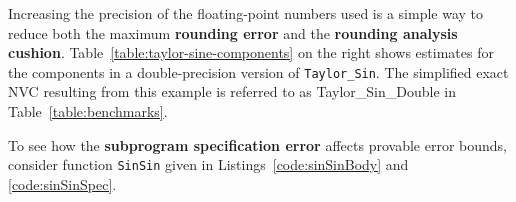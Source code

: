 \documentclass[runningheads]{llncs}
\begin{document}
Increasing the precision of the floating-point numbers used is a simple way to reduce both the maximum \textbf{rounding error} and the \textbf{rounding analysis cushion}.
Table~\ref{table:taylor-sine-components} on the right shows estimates for the components in a double-precision version of \lstinline{Taylor_Sin}.
The simplified exact NVC resulting from this example is referred to as Taylor\_Sin\_Double in Table~\ref{table:benchmarks}.


To see how the \textbf{subprogram specification error} affects provable error bounds, consider function \lstinline{SinSin}
given in Listings~\ref{code:sinSinBody} and \ref{code:sinSinSpec}.
\end{document}
